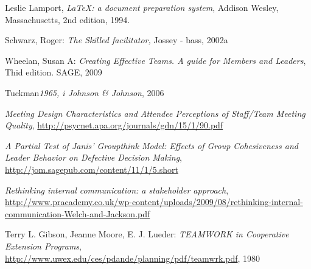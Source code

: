 \begin{thebibliography}{9}

  Leslie Lamport,
  \emph{\LaTeX: a document preparation system},
  Addison Wesley, Massachusetts,
  2nd edition,
  1994.

  Schwarz, Roger: \emph{The Skilled facilitator,}
  Jossey - bass, 2002a

  Wheelan, Susan A: \emph{Creating Effective Teams. A guide for Members and Leaders}, Thid edition. SAGE, 2009

  Tuckman\emph{1965, i Johnson & Johnson}, 2006

  \emph{Meeting Design Characteristics and Attendee Perceptions of Staff/Team Meeting Quality},
  \url{http://psycnet.apa.org/journals/gdn/15/1/90.pdf}

  \emph{A Partial Test of Janis' Groupthink Model: Effects of Group Cohesiveness and Leader Behavior on Defective Decision Making}, \url{http://jom.sagepub.com/content/11/1/5.short}


  \emph{Rethinking internal communication: a stakeholder approach}, \url{http://www.pracademy.co.uk/wp-content/uploads/2009/08/rethinking-internal-communication-Welch-and-Jackson.pdf}


  Terry L. Gibson, Jeanne Moore, E. J. Lueder: \emph{TEAMWORK in Cooperative Extension Programs}, \url{http://www.uwex.edu/ces/pdande/planning/pdf/teamwrk.pdf}, 1980

\end{thebibliography}